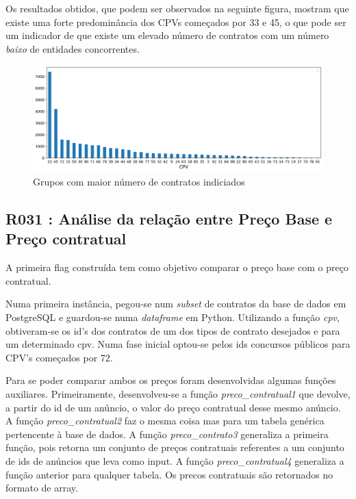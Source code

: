 Os resultados obtidos, que podem ser observados na seguinte figura, mostram que existe uma forte predominância dos CPVs começados por 33 e 45, o que pode ser um indicador de que existe um elevado número de contratos com um número \textit{baixo} de entidades concorrentes. 

\begin{figure}[H]
	\centering
	\includegraphics[width=\textwidth]{imagens/r019.png}
	\caption{Grupos com maior número de contratos indiciados}
	\label{}
\end{figure}





\subsection{R031 : Análise da relação entre Preço Base e Preço contratual}

A primeira flag construída tem como objetivo comparar o preço base com o preço contratual.


Numa primeira instância, pegou-se num \textit{subset} de contratos da base de dados em PostgreSQL e guardou-se numa \textit{dataframe} em Python. 
Utilizando a função \textit{cpv}, obtiveram-se os id's dos contratos de um dos tipos de contrato desejados e para um determinado cpv. Numa fase inicial optou-se pelos ids concursos públicos para CPV's começados por 72. 


Para se poder comparar ambos os preços foram desenvolvidas algumas funções auxiliares.
Primeiramente, desenvolveu-se a função \textit{preco\_contratual1} que devolve, a partir do id de um anúncio, o valor do preço contratual desse mesmo anúncio.
A função \textit{preco\_contratual2} faz o mesma coisa mas para um tabela genérica pertencente à base de dados. A função \textit{preco\_contrato3} generaliza a primeira função, pois retorna um conjunto de preços contratuais referentes a um conjunto de ids de anúncios que leva como input. A função \textit{preco\_contratual4} generaliza a função anterior para qualquer tabela. Os precos contratuais são retornados no formato de array.


